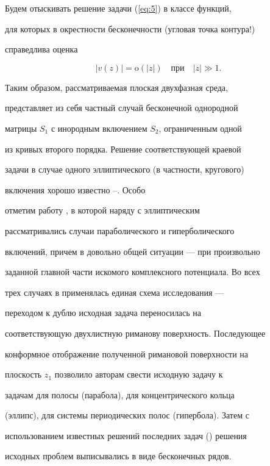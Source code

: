 Будем отыскивать решение задачи (\ref{eq:5}) в классе функций,


для которых в окрестности бесконечности (угловая точка контура!)


справедлива оценка


\begin{equation} %


|v(z)|=\mathrm o(|z|)\quad\text{при}\quad|z|\gg 1.\label{eq:9}


\end{equation}





Таким образом, рассматриваемая плоская двухфазная среда,


представляет из себя частный случай бесконечной однородной


матрицы $S_1$ с инородным включением $S_2$, ограниченным одной


из кривых второго порядка. Решение соответствующей краевой


задачи в случае одного эллиптического (в частности, кругового)


включения хорошо известно \cite{OV}--\cite{E6}. Особо


отметим работу \cite{GS}, в которой наряду с эллиптическим


рассматривались случаи параболического и гиперболического


включений, причем в довольно общей ситуации --- при произвольно


заданной главной части искомого комплексного потенциала. Во всех


трех случаях в \cite{GS} применялась единая схема исследования ---


переходом к дублю исходная задача переносилась на


соответствующую двухлистную риманову поверхность. Последующее


конформное отображение полученной римановой поверхности на


плоскость $z_1$ позволило авторам свести исходную задачу к


задачам для полосы (парабола), для концентрического кольца


(эллипс), для системы периодических полос (гипербола). Затем с


использованием известных решений последних задач (\cite{Kos}) решения


исходных проблем выписывались в виде бесконечных рядов.





